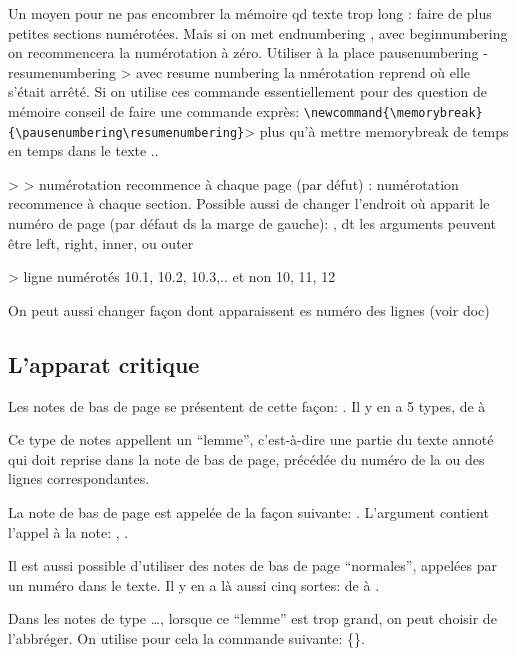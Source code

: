 Un moyen pour ne pas encombrer la mémoire qd texte trop long : faire de plus petites sections numérotées. Mais si on met endnumbering ,  avec beginnumbering on recommencera la numérotation à zéro.  Utiliser à la place pausenumbering - resumenumbering > avec resume numbering la nmérotation reprend où elle s'était arrêté. Si on utilise ces commande essentiellement pour des question de mémoire conseil de faire une commande exprès: \verb|\newcommand{\memorybreak}{\pausenumbering\resumenumbering}|> plus qu'à mettre memorybreak de temps en temps dans le texte ..

 >  > numérotation recommence à chaque page  (par défut) : numérotation recommence à chaque section.
Possible aussi de changer l'endroit où apparit le numéro de page (par défaut ds la marge de gauche): , dt les arguments peuvent être left, right, inner, ou outer

  > ligne numérotés 10.1, 10.2, 10.3,.. et non 10, 11, 12 

On peut aussi changer façon dont apparaissent es numéro des lignes (voir doc)



\subsection{L'apparat critique}

Les notes de bas de page se présentent de cette façon:  . Il y en a 5 types, de  à 


Ce type de notes appellent un \enquote{lemme}, c'est-à-dire une partie du texte annoté qui doit reprise dans la note de bas de page, précédée du numéro de la ou des lignes correspondantes. 

La note de bas de page est appelée de la façon suivante:  . L'argument  contient l'appel à la note: , .

Il est aussi possible d'utiliser  des  notes de bas de page \enquote{normales}, appelées par un numéro dans le texte. Il y en a là aussi cinq sortes: de  à .

Dans les notes de type \dots, lorsque ce \enquote{lemme} est trop grand, on peut choisir de l'abbréger. On utilise pour cela la commande suivante: 
\{\}. 

